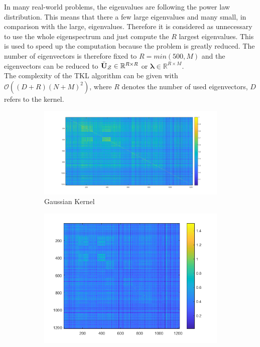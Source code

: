 In many real-world problems, the eigenvalues are following the power law distribution.
This means that there a few large eigenvalues and many small, in comparison with the large, eigenvalues.\cite{Mihail.2002}
Therefore it is considered as unnecessary to use the whole eigenspectrum and just compute the $R$ largest eigenvalues.
This is used to speed up the computation because the problem is greatly reduced.
The number of eigenvectors is therefore fixed to $R=min(500,M)$ and the eigenvectors can be reduced to $\bar{\mathbf{U}}_\mathcal{Z} \in \mathbb{R}^{R\times R}$ or $\mathbf{\lambda} \in \mathbb{R}^{R\times M}$.\cite{Long.}\\
The complexity of the \acs{TKL} algorithm can be given with $\mathcal{O}((D+R)(N+M)^2)$, where $R$ denotes the number of used eigenvectors, $D$ refers to the kernel.\cite{Long.}
\begin{figure}
	\centering
	\begin{subfigure}{.5\textwidth}
		\centering
		\includegraphics[width=1\linewidth]{figures/GaussianKernelIMG.png}
		\caption{Gaussian Kernel\label{FigGaussianKernel}}
	\end{subfigure}%
	\begin{subfigure}{.5\textwidth}
		\centering
		\includegraphics[width=1\linewidth]{figures/TKLKernelIMG.png}

\end{subfigure}
\end{figure}
